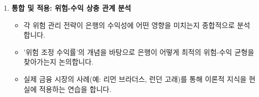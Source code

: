 \documentclass[11pt,a4paper]{article}
\theoremstyle{definition}
\begin{document}
\begin{infobox}[title=\textbf{모듈 3 학습 로드맵}]
\begin{enumerate}
    \item \textbf{통합 및 적용: 위험-수익 상충 관계 분석}
    \begin{itemize}
        \item 각 위험 관리 전략이 은행의 수익성에 어떤 영향을 미치는지 종합적으로 분석합니다.
        \item '위험 조정 수익률'의 개념을 바탕으로 은행이 어떻게 최적의 위험-수익 균형을 찾아가는지 논의합니다.
        \item 실제 금융 시장의 사례(예: 리먼 브라더스, 런던 고래)를 통해 이론적 지식을 현실에 적용하는 연습을 합니다.
    \end{itemize}
\end{enumerate}
\end{infobox}
\end{document}
